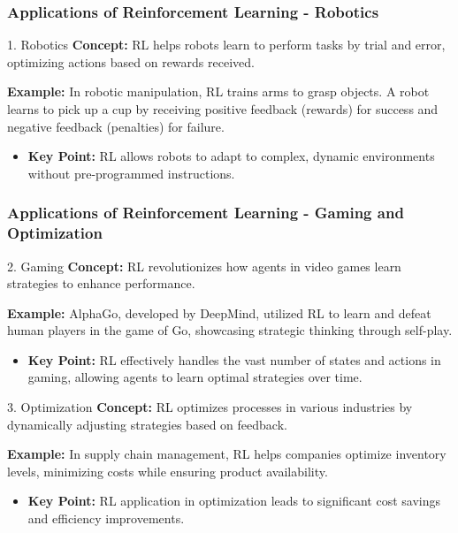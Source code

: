 \documentclass[aspectratio=169]{beamer}
\begin{document}
\begin{frame}[fragile]
    \frametitle{Applications of Reinforcement Learning - Robotics}
    \begin{block}{1. Robotics}
        \textbf{Concept:} RL helps robots learn to perform tasks by trial and error, optimizing actions based on rewards received.
        
        \textbf{Example:} In robotic manipulation, RL trains arms to grasp objects. A robot learns to pick up a cup by receiving positive feedback (rewards) for success and negative feedback (penalties) for failure.
        
        \begin{itemize}
            \item \textbf{Key Point:} RL allows robots to adapt to complex, dynamic environments without pre-programmed instructions.
        \end{itemize}
    \end{block}
\end{frame}

\begin{frame}[fragile]
    \frametitle{Applications of Reinforcement Learning - Gaming and Optimization}
    \begin{block}{2. Gaming}
        \textbf{Concept:} RL revolutionizes how agents in video games learn strategies to enhance performance.
        
        \textbf{Example:} AlphaGo, developed by DeepMind, utilized RL to learn and defeat human players in the game of Go, showcasing strategic thinking through self-play.
        
        \begin{itemize}
            \item \textbf{Key Point:} RL effectively handles the vast number of states and actions in gaming, allowing agents to learn optimal strategies over time.
        \end{itemize}
    \end{block}

    \begin{block}{3. Optimization}
        \textbf{Concept:} RL optimizes processes in various industries by dynamically adjusting strategies based on feedback.
        
        \textbf{Example:} In supply chain management, RL helps companies optimize inventory levels, minimizing costs while ensuring product availability.
        
        \begin{itemize}
            \item \textbf{Key Point:} RL application in optimization leads to significant cost savings and efficiency improvements.
        \end{itemize}
    \end{block}
\end{frame}
\end{document}
